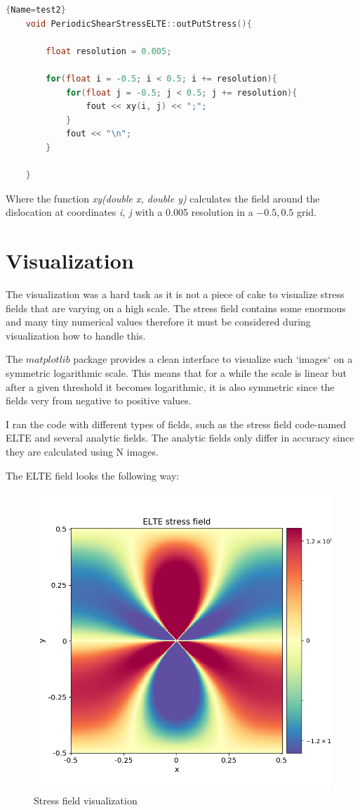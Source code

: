 \documentclass[12pt,a4paper]{article}
\theoremstyle{plain}
\begin{document}
\begin{multicols*}{2}
	\begin{lstlisting}[language=C++]{Name=test2}
	void PeriodicShearStressELTE::outPutStress(){

		float resolution = 0.005;
	
		for(float i = -0.5; i < 0.5; i += resolution){
			for(float j = -0.5; j < 0.5; j += resolution){
				fout << xy(i, j) << ";";
			}
			fout << "\n";
		}
	
	}
	\end{lstlisting}


	\par Where the function \textit{xy(double x, double y)} calculates the field around the dislocation
	at coordinates \textit{i, j} with a 0.005 resolution in a $-0.5, 0.5$ grid.

	\section{Visualization}
	\vspace{0.1cm}

	\par The visualization was a hard task as it is not a piece of cake to visualize
	stress fields that are varying on a high scale. The stress field contains some enormous and
	many tiny numerical values therefore it must be considered during visualization how to handle this.

	\par The $matplotlib$ package provides a clean interface to visualize such
	`images` on a symmetric logarithmic scale. This means that for a while the scale is linear
	but  after a given threshold it becomes logarithmic, it is also symmetric since
	the fields very from negative to positive values.

	I ran the code
	with different types of fields, such as the stress field code-named ELTE and
	several analytic fields. The analytic fields only differ in accuracy since they are
	calculated using N images.

	\par The ELTE field looks the following way:

	\begin{figure}[H]
		\centering
		\includegraphics[width=0.4\columnwidth]{./elte_stress_field.png}
		\caption{Stress field visualization}
	\end{figure}


\end{multicols*}
\end{document}
